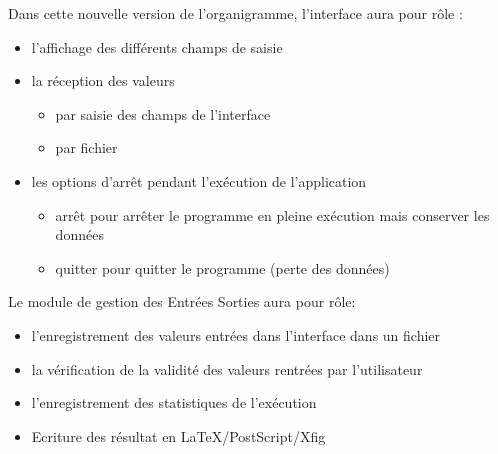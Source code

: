 \documentclass[a4paper,11pt]{article}
\begin{document}
		Dans cette nouvelle version de l’organigramme, l’interface aura pour rôle :
		\begin{itemize}
		\item l’affichage des différents champs de saisie
		\item la réception des valeurs
			\begin{itemize}
				\item par saisie des champs de l’interface
				\item par fichier
			\end{itemize}
			
		\item les options d’arrêt pendant l'exécution de l’application
			\begin{itemize}
				\item arrêt pour arrêter le programme en pleine exécution mais conserver les données
				\item quitter pour quitter le programme (perte des données)\\
			\end{itemize}
		\end{itemize}
		Le module de gestion des Entrées Sorties aura pour rôle:
		\begin{itemize}
				\item l’enregistrement des valeurs entrées dans l’interface dans un fichier
				\item la vérification de la validité des valeurs rentrées par l’utilisateur
				\item l’enregistrement des statistiques de l'exécution
				\item Ecriture des résultat en LaTeX/PostScript/Xfig\\
		\end{itemize}
\end{document}
